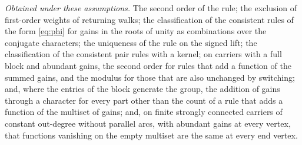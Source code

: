 \emph{Obtained under these assumptions.} The second order of the rule; the exclusion of first-order weights of returning walks; the classification of the consistent rules of the form \eqref{eq:phi} for gains in the roots of unity as combinations over the conjugate characters; the uniqueness of the rule on the signed lift; the classification of the consistent pair rules with a kernel; on carriers with a full block and abundant gains, the second order for rules that add a function of the summed gains, and the modulus for those that are also unchanged by switching; and, where the entries of the block generate the group, the addition of gains through a character for every part other than the count of a rule that adds a function of the multiset of gains; and, on finite strongly connected carriers of constant out-degree without parallel arcs, with abundant gains at every vertex, that functions vanishing on the empty multiset are the same at every end vertex.

